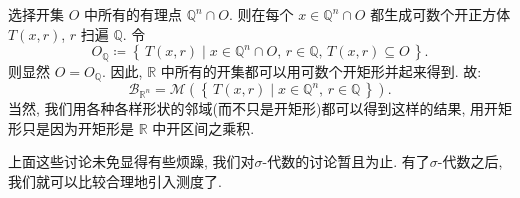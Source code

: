 选择开集 $O$ 中所有的有理点 $\mathbb Q^n\cap O$. 则在每个 $x\in \mathbb Q^n\cap O$ 都生成可数个开正方体 $T(x,r)$, $r$
扫遍 $\mathbb Q$. 令
\[
    O_{\mathbb Q}\coloneqq \left\{\, T(x,r) \mid x\in\mathbb Q^n\cap O,\,r\in\mathbb Q,\,T(x,r)\subseteq O\,\right\}
    .\]
则显然 $O=O_{\mathbb Q}$. 因此, $\mathbb R$ 中所有的开集都可以用可数个开矩形并起来得到. 故:
\[
    \mathcal B_{\mathbb R^n} = \mathcal M\left( \left\{ \,T(x,r)\mid x\in\mathbb Q^n,\,r\in\mathbb Q\, \right\}  \right)
    .\]
当然, 我们用各种各样形状的邻域(而不只是开矩形)都可以得到这样的结果, 用开矩形只是因为开矩形是 $\mathbb R$ 中开区间之乘积.

上面这些讨论未免显得有些烦躁, 我们对\;$\sigma $-代数的讨论暂且为止. 有了\;$\sigma $-代数之后, 我们就可以比较合理地引入测度了.